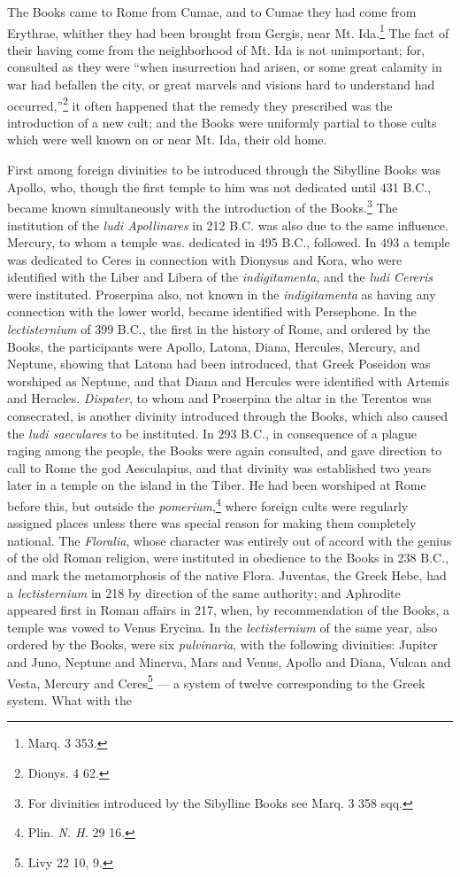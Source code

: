 \documentclass[a4paper, 11pt, oneside, polutonikogreek, english]{article}
\begin{document}
The Books came to Rome from Cumae, and to Cumae they had come from Erythrae, whither they had been brought from Gergis, near Mt. Ida.\footnote{Marq. 3 353.} The fact of their having come from the neighborhood of Mt. Ida is not unimportant; for, consulted as they were ``when insurrection had arisen, or some great calamity in war had befallen the city, or great marvels and visions hard to understand had occurred,''\footnote{Dionys. 4 62.} it often happened that the remedy they prescribed was the introduction of a new cult; and the Books were uniformly partial to those cults which were well known on or near Mt. Ida, their old home.

First among foreign divinities to be introduced through the Sibylline Books was Apollo, who, though the first temple to him was not dedicated until 431 \textsc{B.C.}, became known simultaneously with the introduction of the Books.\footnote{For divinities introduced by the Sibylline Books see Marq. 3 358 sqq.} The institution of the \emph{ludi Apollinares} in 212 \textsc{B.C.} was also due to the same influence. Mercury, to whom a temple was. dedicated in 495 \textsc{B.C.}, followed. In 493 a temple was dedicated to Ceres in connection with Dionysus and Kora, who were identified with the Liber and Libera of the \emph{indigitamenta}, and the \emph{ludi Cereris} were instituted. Proserpina also, not known in the \emph{indigitamenta} as having any connection with the lower world, became identified with Persephone. In the \emph{lectisternium} of 399 \textsc{B.C.}, the first in the history of Rome, and ordered by the Books, the participants were Apollo, Latona, Diana, Hercules, Mercury, and Neptune, showing that Latona had been introduced, that Greek Poseidon was worshiped as Neptune, and that Diana and Hercules were identified with Artemis and Heracles. \emph{Dispater}, to whom and Proserpina the altar in the Terentos was consecrated, is another divinity introduced through the Books, which also caused the \emph{ludi saeculares} to be instituted. In 293 \textsc{B.C.}, in consequence of a plague raging among the people, the Books were again consulted, and gave direction to call to Rome the god Aesculapius, and that divinity was established two years later in a temple on the island in the Tiber. He had been worshiped at Rome before this, but outside the \emph{pomerium},\footnote{Plin. \emph{N. H.} 29 16.} where foreign cults were regularly assigned places unless there was special reason for making them completely national. The \emph{Floralia}, whose character was entirely out of accord with the genius of the old Roman religion, were instituted in obedience to the Books in 238 \textsc{B.C.}, and mark the metamorphosis of the native Flora. Juventas, the Greek Hebe, had a \emph{lectisternium} in 218 by direction of the same authority; and Aphrodite appeared first in Roman affairs in 217, when, by recommendation of the Books, a temple was vowed to Venus Erycina. In the \emph{lectisternium} of the same year, also ordered by the Books, were six \emph{pulvinaria}, with the following divinities: Jupiter and Juno, Neptune and Minerva, Mars and Venus, Apollo and Diana, Vulcan and Vesta, Mercury and Ceres\footnote{Livy 22 10, 9.} --- a system of twelve corresponding to the Greek system. What with the 
\end{document}
